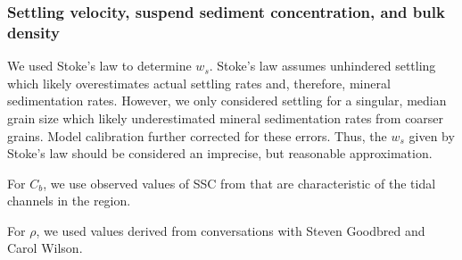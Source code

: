 \subsubsection*{Settling velocity, suspend sediment concentration, and bulk density}

We used Stoke's law to determine $w_s$. Stoke's law assumes unhindered settling which likely overestimates actual settling rates and, therefore, mineral sedimentation rates. However, we only considered settling for a singular, median grain size which likely underestimated mineral sedimentation rates from coarser grains. Model calibration further corrected for these errors. Thus, the $w_s$ given by Stoke's law should be considered an imprecise, but reasonable approximation.

For $C_{b}$, we use observed values of SSC from \citet{haleObservationsScalingTidal2019} that are characteristic of the tidal channels in the region.

For $\rho$, we used values derived from conversations with Steven Goodbred and Carol Wilson.